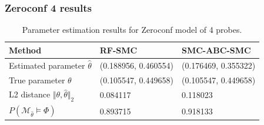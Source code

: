 \documentclass{beamer}
\begin{document}
\begin{frame}
    \frametitle{Zeroconf 4 results}
    \footnotesize{
        \begin{table}[H]
            \begin{tabular}{|l|l|l|}
                \hline
                Method                                           & RF-SMC               & SMC-ABC-SMC          \\ \hline
                Estimated parameter $\hat{\theta}$               & (0.188956, 0.460554) & (0.176469, 0.355322) \\ \hline
                True parameter $\theta$                          & (0.105547, 0.449658) & (0.105547, 0.449658) \\ \hline
                L2 distance $\Vert \theta, \hat{\theta} \Vert_2$ & 0.084117             & 0.118023             \\ \hline
                $P(\mathcal{M}_{\hat{\theta}}\models\Phi)$       & 0.893715             & 0.918133             \\ \hline
            \end{tabular}
            \caption{Parameter estimation results for Zeroconf model of 4 probes.}
        \end{table}
    }
\end{frame}
\end{document}
